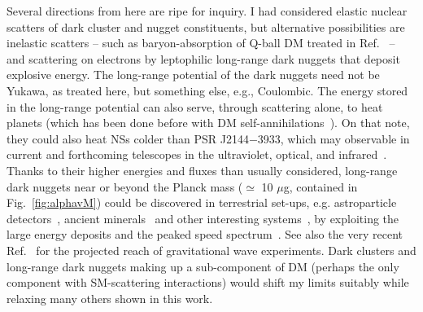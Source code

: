 \documentclass[
    twocolumn,
	prd,
        amssymb,
	preprintnumbers,
	secnumarabic,
	nofootinbib,
	superscriptaddress]{revtex4-1}
\begin{document}
Several directions from here are ripe for inquiry.
I had considered elastic nuclear scatters of dark cluster and nugget constituents, but alternative possibilities are inelastic scatters -- such as baryon-absorption of Q-ball DM treated in Ref.~\cite{Graham:2018efk} -- and scattering on electrons by leptophilic long-range dark nuggets that deposit explosive energy.
The long-range potential of the dark nuggets need not be Yukawa, as treated here, but something else, e.g., Coulombic.
The energy stored in the long-range potential can also serve, through scattering alone, to heat planets (which has been done before with DM self-annihilations~\cite{GlobalWarming:Kawasaki:1991eu,GlobalWarming:Abbas:1996kk,GlobalWarming:Mack:2007xj,GlobalWarming:Hooper:2011dw,GlobalWarming:Garani:2019rcb,GlobalWarming:Bramante:2019fhi,GlobalWarming:Acevedo:2020gro,GlobalWarming:Leane:2020wob,GlobalWarming:Bramante:2022pmn}). 
On that note, they could also heat NSs colder than PSR J2144$-$3933, which may observable in current and forthcoming telescopes in the ultraviolet, optical, and infrared~\cite{NSvIR:Baryakhtar:DKHNS,NSvIR:clumps2021,McKeen:2020oyr,McKeen:2021jbh,theluvoirteam2019luvoir,DES:2019rtl,Rubin1,Rubin2,JWST:Gardner:2006ky,ELT:neichel2018overview,TMT:2015pvw,green2012widefield}.
Thanks to their higher energies and fluxes than usually considered, long-range dark nuggets near or beyond the Planck mass ($\simeq$ 10 $\mu$g, contained in Fig.~\ref{fig:alphavM}) could be discovered in terrestrial set-ups, e.g. 
astroparticle detectors~\cite{MACRO:2000cdb,Bramante:2018qbc,Bramante:2018tos,Bramante:2019yss,Cappiello:2020lbk,BlobsGrabowska:2018lnd,Bai:2022nsv,Bhoonah:2020fys,xmaslights:DEAPCollaboration:2021raj,XENON:2023ysy,snowmass:Carney:2022gse},
ancient minerals~\cite{Snowden-Ifft:1995zgn,Baum:2018tfw,Drukier:2018pdy,Acevedo:2021tbl,Baum:2023cct} and other interesting systems~\cite{SinghSidhu:2018oqs,SinghSidhu:2019cpq,SinghSidhu:2019loh,SinghSidhu:2019znk,Dhakal:2022rwn}, by exploiting the large energy deposits and the peaked speed spectrum~\cite{Davoudiasl:2020ypv}.
See also the very recent Ref.~\cite{GWDuLeeWangZurek:2023dhk} for the projected reach of gravitational wave experiments.
Dark clusters and long-range dark nuggets making up a sub-component of DM (perhaps the only component with SM-scattering interactions) would shift my limits suitably while relaxing many others shown in this work.
\end{document}

